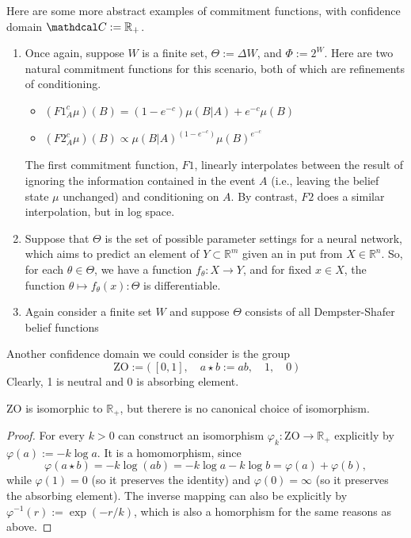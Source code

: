\documentclass{article}
\def\cofunc{commitment function}
\def\confdom{\mathdcal C}
\begin{document}
Here are some more abstract examples of \cofunc s, with confidence domain
$\confdom := \mathbb R_+$.
\begin{enumerate}
\item
Once again, suppose $W$ is a finite set,
$\Theta := \Delta W$, and $\Phi := 2^W$.
Here are two natural \cofunc s for this scenario, both of which are refinements of conditioning.
\begin{itemize}
    \item
    $\displaystyle
        (F1^c_A \mu)(B) = (1-e^{-c}) \mu(B|A) +  e^{-c} \mu(B)
    $
    \item
    $\displaystyle
        (F2^c_A \mu)(B) \propto \mu(B|A)^{(1-e^{-c})} \mu(B)^{e^{-c}}
    $
\end{itemize}
The first \cofunc, $F1$, linearly interpolates between the result of ignoring the information contained in the event $A$ (i.e., leaving the belief state $\mu$ unchanged) and conditioning on $A$.
By contrast, $F2$ does a similar interpolation, but in log space.

\item
Suppose that $\Theta$ is the set of possible parameter settings for a neural network, which aims to predict an element of $Y \subset \mathbb R^{m}$ given an in put from $X \in \mathbb R^{n}$.
So, for each $\theta \in \Theta$, we have a function $f_\theta : X \to Y$, and for fixed $x \in X$, the function $\theta \mapsto f_\theta(x) : \Theta$ is differentiable.




\item
Again consider a finite set $W$ and suppose $\Theta$ consists of all Dempster-Shafer belief functions
\end{enumerate}


Another confidence domain we could consider is the group
\[
    \mathrm{ZO} := \Big(~ [0,1],
        \quad a \star b := a b,
        \quad 1,
        \quad 0 ~\Big)
\]
Clearly, 1 is neutral and 0 is absorbing element.
\begin{prop}
    $\mathrm{ZO}$ is isomorphic to $\mathbb R_+$, but therere is no canonical choice of isomorphism.
\end{prop}
\begin{proof}
    For every $k > 0$ can construct an isomorphism $\varphi_k: \mathrm{ZO} \to \mathbb R_+$ explicitly by $\varphi(a) := - k \log a$.
    It is a homomorphism, since
    \[
        \varphi(a \star b) = - k \log (a b) = - k \log a - k \log b =
            \varphi(a) + \varphi(b),
    \]
    while $\varphi(1) = 0$ (so it preserves the identity) and $\varphi(0) = \infty$ (so it preserves the absorbing element).
    The inverse mapping can also be explicitly by $\varphi^{-1}(r) := \exp( - r / k)$, which is also a homorphism for the same reasons as above.
\end{proof}
\end{document}
